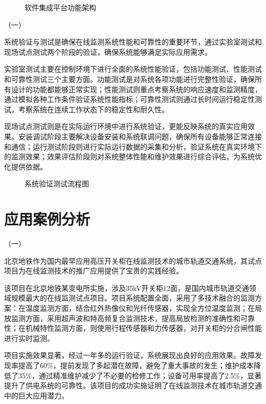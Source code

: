 \begin{figure}[h]
\centering
\caption{软件集成平台功能架构}
\label{fig:software_integration_platform}
\end{figure}

（一）

系统验证与测试是确保在线监测系统性能和可靠性的重要环节，通过实验室测试和现场试点测试两个阶段的验证，确保系统能够满足实际应用需求。

实验室测试主要在控制环境下进行全面的系统性能验证，包括功能测试、性能测试和可靠性测试三个主要方面。功能测试是对系统各项功能进行完整性验证，确保所有设计的功能都能够正常实现；性能测试则重点考察系统的响应速度和监测精度，通过模拟各种工作条件验证系统性能指标；可靠性测试则通过长时间运行稳定性测试，考察系统在连续工作状态下的稳定性和耐久性。

现场试点测试则是在实际运行环境中进行系统验证，更能反映系统的真实应用效果。安装调试阶段主要解决设备安装和系统联调问题，确保所有设备能够正常连接和通信；运行测试阶段则进行实际运行数据的采集和分析，验证系统在真实环境下的监测效果；效果评估阶段则对系统整体性能和维护效果进行综合评估，为系统优化提供依据。

\begin{figure}[h]
\centering
\caption{系统验证测试流程图}
\label{fig:system_testing_process}
\end{figure}

\section{应用案例分析}

（一）

北京地铁作为国内最早应用高压开关柜在线监测技术的城市轨道交通系统，其试点项目为在线监测技术的推广应用提供了宝贵的实践经验。

该项目在北京地铁某变电所实施，涉及35kV开关柜12面，是国内城市轨道交通领域规模最大的在线监测试点项目。项目系统配置全面，采用了多技术融合的监测方案：在温度监测方面，结合红外热像仪和光纤传感器，实现全方位温度监测；在局放监测方面，采用超声波和特高频复合监测技术，提高局放检测的准确性和可靠性；在机械特性监测方面，则使用行程传感器和力传感器，对开关柜的分合闸性能进行实时监测。

项目实施效果显著，经过一年多的运行验证，系统展现出良好的应用效果。故障发现率提高了60\%，提前发现了多起潜在故障，避免了重大事故的发生；维护成本降低了35\%，通过精准维护减少了不必要的检修工作；设备可用率提高了2.5\%，显著提升了供电系统的可靠性。该项目的成功实施证明了在线监测技术在城市轨道交通中的巨大应用潜力。

